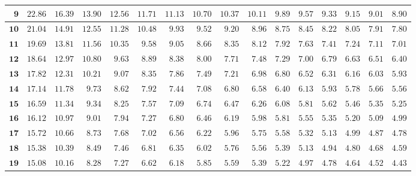 \begin{longtable}{|r|r|r|r|r|r|r|r|r|r|r|r|r|r|r|r|}
    \(\mathbf{9}\) & \(22.86\) & \(16.39\) & \(13.90\) & \(12.56\) & \(11.71\) & \(11.13\) & \(10.70\) & \(10.37\) & \(10.11\) & \(9.89\) & \(9.57\) & \(9.33\) & \(9.15\) & \(9.01\) & \(8.90\) \\ \hline 
    \(\mathbf{10}\) & \(21.04\) & \(14.91\) & \(12.55\) & \(11.28\) & \(10.48\) & \(9.93\) & \(9.52\) & \(9.20\) & \(8.96\) & \(8.75\) & \(8.45\) & \(8.22\) & \(8.05\) & \(7.91\) & \(7.80\) \\ \hline 
    \(\mathbf{11}\) & \(19.69\) & \(13.81\) & \(11.56\) & \(10.35\) & \(9.58\) & \(9.05\) & \(8.66\) & \(8.35\) & \(8.12\) & \(7.92\) & \(7.63\) & \(7.41\) & \(7.24\) & \(7.11\) & \(7.01\) \\ \hline 
    \(\mathbf{12}\) & \(18.64\) & \(12.97\) & \(10.80\) & \(9.63\) & \(8.89\) & \(8.38\) & \(8.00\) & \(7.71\) & \(7.48\) & \(7.29\) & \(7.00\) & \(6.79\) & \(6.63\) & \(6.51\) & \(6.40\) \\ \hline 
    \(\mathbf{13}\) & \(17.82\) & \(12.31\) & \(10.21\) & \(9.07\) & \(8.35\) & \(7.86\) & \(7.49\) & \(7.21\) & \(6.98\) & \(6.80\) & \(6.52\) & \(6.31\) & \(6.16\) & \(6.03\) & \(5.93\) \\ \hline 
    \(\mathbf{14}\) & \(17.14\) & \(11.78\) & \(9.73\) & \(8.62\) & \(7.92\) & \(7.44\) & \(7.08\) & \(6.80\) & \(6.58\) & \(6.40\) & \(6.13\) & \(5.93\) & \(5.78\) & \(5.66\) & \(5.56\) \\ \hline 
    \(\mathbf{15}\) & \(16.59\) & \(11.34\) & \(9.34\) & \(8.25\) & \(7.57\) & \(7.09\) & \(6.74\) & \(6.47\) & \(6.26\) & \(6.08\) & \(5.81\) & \(5.62\) & \(5.46\) & \(5.35\) & \(5.25\) \\ \hline 
    \(\mathbf{16}\) & \(16.12\) & \(10.97\) & \(9.01\) & \(7.94\) & \(7.27\) & \(6.80\) & \(6.46\) & \(6.19\) & \(5.98\) & \(5.81\) & \(5.55\) & \(5.35\) & \(5.20\) & \(5.09\) & \(4.99\) \\ \hline 
    \(\mathbf{17}\) & \(15.72\) & \(10.66\) & \(8.73\) & \(7.68\) & \(7.02\) & \(6.56\) & \(6.22\) & \(5.96\) & \(5.75\) & \(5.58\) & \(5.32\) & \(5.13\) & \(4.99\) & \(4.87\) & \(4.78\) \\ \hline 
    \(\mathbf{18}\) & \(15.38\) & \(10.39\) & \(8.49\) & \(7.46\) & \(6.81\) & \(6.35\) & \(6.02\) & \(5.76\) & \(5.56\) & \(5.39\) & \(5.13\) & \(4.94\) & \(4.80\) & \(4.68\) & \(4.59\) \\ \hline 
    \(\mathbf{19}\) & \(15.08\) & \(10.16\) & \(8.28\) & \(7.27\) & \(6.62\) & \(6.18\) & \(5.85\) & \(5.59\) & \(5.39\) & \(5.22\) & \(4.97\) & \(4.78\) & \(4.64\) & \(4.52\) & \(4.43\) \\ \hline 

\end{longtable}
